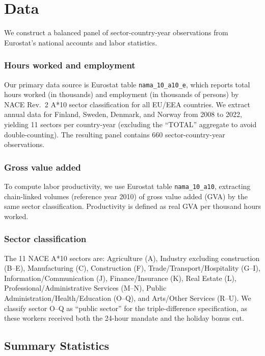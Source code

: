 \documentclass[12pt]{article}
\begin{document}
\section{Data}

We construct a balanced panel of sector-country-year observations from Eurostat's national accounts and labor statistics.

\subsubsection*{Hours worked and employment} Our primary data source is Eurostat table \texttt{nama\_10\_a10\_e}, which reports total hours worked (in thousands) and employment (in thousands of persons) by NACE Rev.~2 A*10 sector classification for all EU/EEA countries. We extract annual data for Finland, Sweden, Denmark, and Norway from 2008 to 2022, yielding 11 sectors per country-year (excluding the ``TOTAL'' aggregate to avoid double-counting). The resulting panel contains 660 sector-country-year observations.

\subsubsection*{Gross value added} To compute labor productivity, we use Eurostat table \texttt{nama\_10\_a10}, extracting chain-linked volumes (reference year 2010) of gross value added (GVA) by the same sector classification. Productivity is defined as real GVA per thousand hours worked.

\subsubsection*{Sector classification} The 11 NACE A*10 sectors are: Agriculture (A), Industry excluding construction (B--E), Manufacturing (C), Construction (F), Trade/Transport/Hospitality (G--I), Information/Communication (J), Finance/Insurance (K), Real Estate (L), Professional/Administrative Services (M--N), Public Administration/Health/Education (O--Q), and Arts/Other Services (R--U). We classify sector O--Q as ``public sector'' for the triple-difference specification, as these workers received both the 24-hour mandate and the holiday bonus cut.

\subsection{Summary Statistics}


\end{document}
